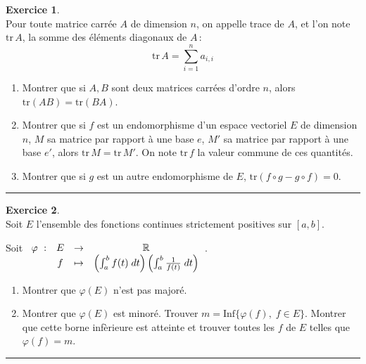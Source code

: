 \documentclass[a4paper,10pt]{article}
\theoremstyle{definition}
\theoremstyle{definition}
\newtheorem{exo}{Exercice}
\newcommand{\R}{\mathbb{R}}
\begin{document}
\newpage

\begin{exo}\quad\\[0.25cm]
Pour toute matrice carrée $A$ de dimension $n$, 
on appelle trace de $A$, et l'on note $\textrm{tr}\, A$, la
somme des éléments diagonaux de $A$\,:
$$\textrm{tr}\, A = \sum_{i = 1}^n a_{i,i}$$
\begin{enumerate}
	\item Montrer que si $A, B$ sont deux matrices carrées
	d'ordre $n$, alors $\textrm{tr}(AB)=\textrm{tr} (BA)$.
	
	\item Montrer que si $f$ est un endomorphisme d'un espace
	vectoriel $E$ de dimension $n$, $M$ sa matrice par rapport à
	une base $e$, $M'$ sa matrice par rapport à une base $e'$,
	alors $\textrm{tr}\, M = \textrm{tr}\, M'$. 
	On note $\textrm{tr}\, f$ la valeur commune de ces quantités.
	
	\item Montrer que si $g$ est un autre endomorphisme de $E$,
	$\textrm{tr}(f\circ g - g\circ f) = 0$.
\end{enumerate}
	
	
	\centering
	\rule{1\linewidth}{0.6pt}
\end{exo}

\begin{exo}\quad\\[0.25cm]
Soit $E$ l'ensemble des fonctions continues strictement positives sur $[a,b]$.

Soit $\begin{array}[t]{cccc}
\varphi~:&E&\rightarrow&\R\\
&f&\mapsto&\left(\int_{a}^{b}f(t)\;dt\right)\left(\int_{a}^{b}\frac{1}{f(t)}\;dt\right)
\end{array}$.

\begin{enumerate}
	\item  Montrer que $\varphi(E)$ n'est pas majoré.
	\item  Montrer que $\varphi(E)$ est minoré. Trouver $m=\mbox{Inf}\{\varphi(f),\;f\in E\}$. Montrer que cette borne infèrieure est atteinte et trouver toutes les $f$ de $E$ telles que $\varphi(f)=m$.
\end{enumerate}	
	
	
	\centering
	\rule{1\linewidth}{0.6pt}
\end{exo}
\end{document}
